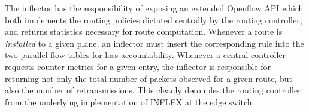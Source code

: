 The inflector has the responsibility of exposing an extended Openflow \ac{API} which both implements the routing policies dictated centrally by the routing controller, and returns statistics necessary for route computation.
Whenever a route is \emph{installed} to a given plane, an inflector must insert the corresponding rule into the two parallel flow tables for loss accountability.
Whenever a central controller requests counter metrics for a given entry, the inflector is responsible for returning not only the total number of packets observed for a given route, but also the number of retransmissions.
This cleanly decouples the routing controller from the underlying implementation of INFLEX at the edge switch.
